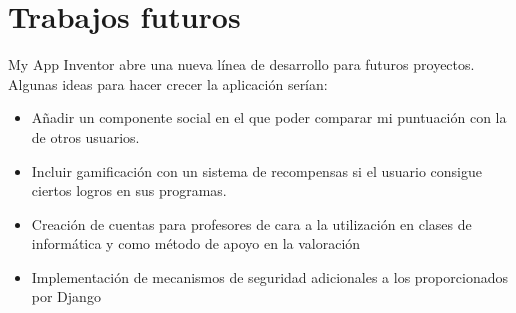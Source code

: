 \documentclass[a4paper, 12pt]{book}
\begin{document}
\section{Trabajos futuros}
\label{sec:trabajos_futuros}

My App Inventor abre una nueva línea de desarrollo para futuros proyectos. Algunas ideas para hacer crecer la aplicación serían:
\begin{itemize}
  \item Añadir un componente social en el que poder comparar mi puntuación con la de otros usuarios.
  \item Incluir gamificación con un sistema de recompensas si el usuario consigue ciertos logros en sus programas. 
  \item Creación de cuentas para profesores de cara a la utilización en clases de informática y como método de apoyo en la valoración
  \item Implementación de mecanismos de seguridad adicionales a los proporcionados por Django 
\end{itemize}


%


\cleardoublepage


\end{document}
